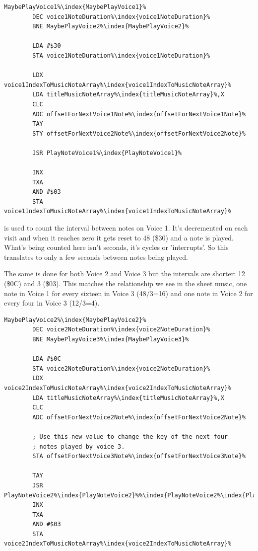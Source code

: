 \begin{lstlisting}[caption=\icode{MaybePlayVoice1\index{MaybePlayVoice1}}\, part of \icode{PlayTitleScreenMusic\index{PlayTitleScreenMusic}}.,basicstyle=\tiny,escapechar=\%]
MaybePlayVoice1%\index{MaybePlayVoice1}%   
        DEC voice1NoteDuration%\index{voice1NoteDuration}%
        BNE MaybePlayVoice2%\index{MaybePlayVoice2}%

        LDA #$30
        STA voice1NoteDuration%\index{voice1NoteDuration}%

        LDX voice1IndexToMusicNoteArray%\index{voice1IndexToMusicNoteArray}%
        LDA titleMusicNoteArray%\index{titleMusicNoteArray}%,X
        CLC
        ADC offsetForNextVoice1Note%\index{offsetForNextVoice1Note}%
        TAY
        STY offsetForNextVoice2Note%\index{offsetForNextVoice2Note}%

        JSR PlayNoteVoice1%\index{PlayNoteVoice1}%

        INX
        TXA
        AND #$03
        STA voice1IndexToMusicNoteArray%\index{voice1IndexToMusicNoteArray}%
\end{lstlisting}
 is used to count the interval between notes on Voice 1. It's decremented on each
visit and when it reaches zero it gets reset to 48 (\$30) and a note is played. What's being counted here isn't
seconds, it's cycles or 'interrupts'. So this translates to only a few seconds between notes being played.

The same is done for both Voice 2 and Voice 3 but the intervals are shorter: 12 (\$0C) and 3 (\$03). This matches
the relationship we see in the sheet music, one note in Voice 1 for every sixteen in Voice 3 (48/3=16) and one note in
Voice 2 for every four in Voice 3 (12/3=4).

\begin{lstlisting}[caption=\icode{MaybePlayVoice2\index{MaybePlayVoice2}}\, part of \icode{PlayTitleScreenMusic\index{PlayTitleScreenMusic}}.,escapechar=\%]
MaybePlayVoice2%\index{MaybePlayVoice2}%   
        DEC voice2NoteDuration%\index{voice2NoteDuration}%
        BNE MaybePlayVoice3%\index{MaybePlayVoice3}%

        LDA #$0C
        STA voice2NoteDuration%\index{voice2NoteDuration}%
        LDX voice2IndexToMusicNoteArray%\index{voice2IndexToMusicNoteArray}%
        LDA titleMusicNoteArray%\index{titleMusicNoteArray}%,X
        CLC
        ADC offsetForNextVoice2Note%\index{offsetForNextVoice2Note}%

        ; Use this new value to change the key of the next four
        ; notes played by voice 3. 
        STA offsetForNextVoice3Note%\index{offsetForNextVoice3Note}%

        TAY
        JSR PlayNoteVoice2%\index{PlayNoteVoice2}%%\index{PlayNoteVoice2%\index{PlayNoteVoice2}%}%
        INX
        TXA
        AND #$03
        STA voice2IndexToMusicNoteArray%\index{voice2IndexToMusicNoteArray}%
\end{lstlisting}

